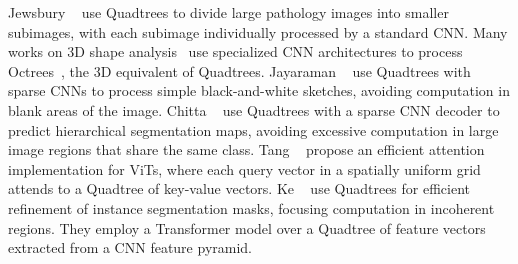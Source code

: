 Jewsbury \etal~\cite{Jewsbury2021AQI} use Quadtrees to divide large pathology images into smaller subimages, with each subimage individually processed by a standard CNN. Many works on 3D shape analysis~\cite{Riegler2016OctNetLD,Tatarchenko2017OctreeGN,Wang2017OCNN} use specialized CNN architectures to process Octrees~\cite{Meagher1980Octree}, the 3D equivalent of Quadtrees. Jayaraman \etal~\cite{Jayaraman2018QuadtreeCN} use Quadtrees with sparse CNNs to process simple black-and-white sketches, avoiding computation in blank areas of the image. Chitta \etal~\cite{Chitta2019QuadtreeGN} use Quadtrees with a sparse CNN decoder to predict hierarchical segmentation maps, avoiding excessive computation in large image regions that share the same class. Tang \etal~\cite{Tang2022QuadTreeAF} propose an efficient attention implementation for ViTs, where each query vector in a spatially uniform grid attends to a Quadtree of key-value vectors. Ke \etal~\cite{Ke2021MaskTF} use Quadtrees for efficient refinement of instance segmentation masks, focusing computation in incoherent regions. They employ a Transformer model over a Quadtree of feature vectors extracted from a CNN feature pyramid.

